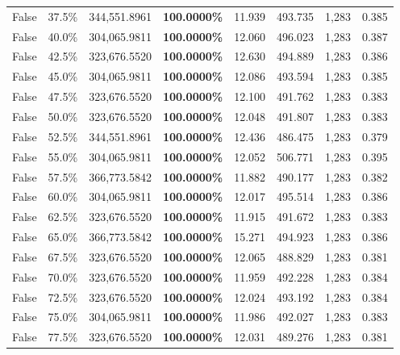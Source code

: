 \begin{table}[H]
\begin{tabular}{lllrllll}
\cline{1-8}
False & 37.5\% & 344,551.8961 & \bfseries \color{red} 100.0000\% & 11.939 & 493.735 & 1,283 & 0.385 \\
\cline{1-8}
False & 40.0\% & \color{red} 304,065.9811 & \bfseries \color{red} 100.0000\% & 12.060 & 496.023 & 1,283 & 0.387 \\
\cline{1-8}
False & 42.5\% & 323,676.5520 & \bfseries \color{red} 100.0000\% & 12.630 & 494.889 & 1,283 & 0.386 \\
\cline{1-8}
False & 45.0\% & \color{red} 304,065.9811 & \bfseries \color{red} 100.0000\% & 12.086 & 493.594 & 1,283 & 0.385 \\
\cline{1-8}
False & 47.5\% & 323,676.5520 & \bfseries \color{red} 100.0000\% & 12.100 & 491.762 & 1,283 & 0.383 \\
\cline{1-8}
False & 50.0\% & 323,676.5520 & \bfseries \color{red} 100.0000\% & 12.048 & 491.807 & 1,283 & 0.383 \\
\cline{1-8}
False & 52.5\% & 344,551.8961 & \bfseries \color{red} 100.0000\% & 12.436 & 486.475 & 1,283 & 0.379 \\
\cline{1-8}
False & 55.0\% & \color{red} 304,065.9811 & \bfseries \color{red} 100.0000\% & 12.052 & 506.771 & 1,283 & 0.395 \\
\cline{1-8}
False & 57.5\% & 366,773.5842 & \bfseries \color{red} 100.0000\% & 11.882 & 490.177 & 1,283 & 0.382 \\
\cline{1-8}
False & 60.0\% & \color{red} 304,065.9811 & \bfseries \color{red} 100.0000\% & 12.017 & 495.514 & 1,283 & 0.386 \\
\cline{1-8}
False & 62.5\% & 323,676.5520 & \bfseries \color{red} 100.0000\% & 11.915 & 491.672 & 1,283 & 0.383 \\
\cline{1-8}
False & 65.0\% & 366,773.5842 & \bfseries \color{red} 100.0000\% & 15.271 & 494.923 & 1,283 & 0.386 \\
\cline{1-8}
False & 67.5\% & 323,676.5520 & \bfseries \color{red} 100.0000\% & 12.065 & 488.829 & 1,283 & 0.381 \\
\cline{1-8}
False & 70.0\% & 323,676.5520 & \bfseries \color{red} 100.0000\% & 11.959 & 492.228 & 1,283 & 0.384 \\
\cline{1-8}
False & 72.5\% & 323,676.5520 & \bfseries \color{red} 100.0000\% & 12.024 & 493.192 & 1,283 & 0.384 \\
\cline{1-8}
False & 75.0\% & \color{red} 304,065.9811 & \bfseries \color{red} 100.0000\% & 11.986 & 492.027 & 1,283 & 0.383 \\
\cline{1-8}
False & 77.5\% & 323,676.5520 & \bfseries \color{red} 100.0000\% & 12.031 & 489.276 & 1,283 & 0.381 \\

\end{tabular}
\end{table}
